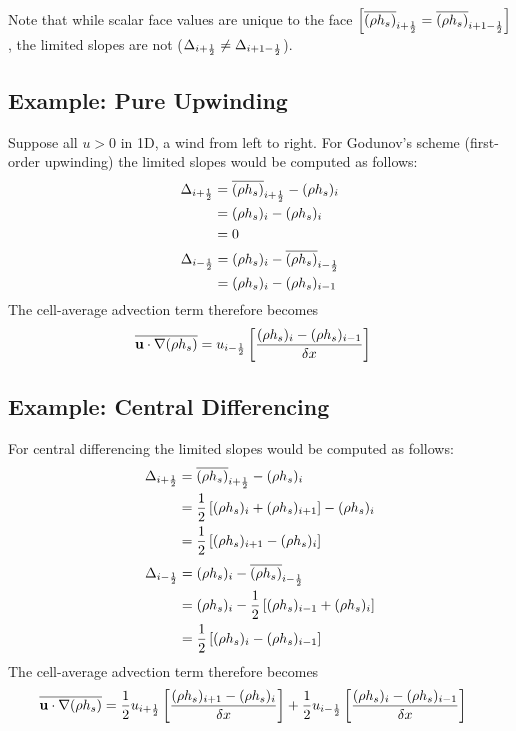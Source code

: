Note that while scalar face values are unique to the face $\left[\overline{(\rho h_s)}_{i+\mbox{\tiny $\frac{1}{2}$}} = \overline{(\rho h_s)}_{i+1-\mbox{\tiny $\frac{1}{2}$}}\right]$, the limited slopes are not ($\Delta_{i+\mbox{\tiny $\frac{1}{2}$}} \ne \Delta_{i+1-\mbox{\tiny $\frac{1}{2}$}}$).

\subsection{Example: Pure Upwinding}
Suppose all $u>0$ in 1D, a wind from left to right.  For Godunov's scheme (first-order upwinding) the limited slopes would be computed as follows:
\begin{align}
\Delta_{i+\mbox{\tiny $\frac{1}{2}$}} &= \overline{(\rho h_s)}_{i+\mbox{\tiny $\frac{1}{2}$}} - (\rho h_s)_i \notag\\
&= (\rho h_s)_i - (\rho h_s)_i \notag\\
&= 0
\end{align}
\begin{align}
\Delta_{i-\mbox{\tiny $\frac{1}{2}$}} &= (\rho h_s)_i - \overline{(\rho h_s)}_{i-\mbox{\tiny $\frac{1}{2}$}} \notag\\
&= (\rho h_s)_i - (\rho h_s)_{i-1}
\end{align}
The cell-average advection term therefore becomes
\begin{align}
\overline{\mathbf{u}\cdot\nabla(\rho h_s)} &= u_{i-\mbox{\tiny $\frac{1}{2}$}} \left[ \frac{(\rho h_s)_i - (\rho h_s)_{i-1}}{\delta x} \right]
\end{align}

\subsection{Example: Central Differencing}
For central differencing the limited slopes would be computed as follows:
\begin{align}
\Delta_{i+\mbox{\tiny $\frac{1}{2}$}} &= \overline{(\rho h_s)}_{i+\mbox{\tiny $\frac{1}{2}$}} - (\rho h_s)_i \notag\\
&= \frac{1}{2}\left[(\rho h_s)_i + (\rho h_s)_{i+1}\right] - (\rho h_s)_i \notag\\
&= \frac{1}{2}\left[(\rho h_s)_{i+1} - (\rho h_s)_i\right]
\end{align}
\begin{align}
\Delta_{i-\mbox{\tiny $\frac{1}{2}$}} &= (\rho h_s)_i - \overline{(\rho h_s)}_{i-\mbox{\tiny $\frac{1}{2}$}} \notag\\
&= (\rho h_s)_i - \frac{1}{2}\left[(\rho h_s)_{i-1} + (\rho h_s)_i\right] \notag\\
&= \frac{1}{2}\left[ (\rho h_s)_i - (\rho h_s)_{i-1} \right]
\end{align}
The cell-average advection term therefore becomes
\begin{align}
\overline{\mathbf{u}\cdot\nabla(\rho h_s)} &= \frac{1}{2}  u_{i+\mbox{\tiny $\frac{1}{2}$}} \left[ \frac{(\rho h_s)_{i+1} - (\rho h_s)_i}{\delta x} \right] + \frac{1}{2} u_{i-\mbox{\tiny $\frac{1}{2}$}} \left[ \frac{(\rho h_s)_i - (\rho h_s)_{i-1}}{\delta x} \right]
\end{align}

